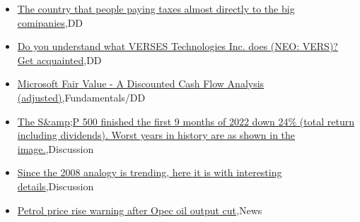 \documentclass{article}%
\begin{document}
%
\begin{itemize}%
\item%
\href{https://reddit.com/r/wallstreetbets/comments/xx4a95/the\_country\_that\_people\_paying\_taxes\_almost/}{The country that people paying taxes almost directly to the big comipanies},DD%
\item%
\href{https://reddit.com/r/Baystreetbets/comments/xwjr27/do\_you\_understand\_what\_verses\_technologies\_inc/}{Do you understand what VERSES Technologies Inc. does (NEO: VERS)? Get acquainted},DD%
\item%
\href{https://reddit.com/r/StockMarket/comments/xx1z98/microsoft\_fair\_value\_a\_discounted\_cash\_flow/}{Microsoft Fair Value - A Discounted Cash Flow Analysis (adjusted)},Fundamentals/DD%
\item%
\href{https://reddit.com/r/StockMarket/comments/xwquhx/the\_sp\_500\_finished\_the\_first\_9\_months\_of\_2022/}{The S\&amp;P 500 finished the first 9 months of 2022 down 24\% (total return including dividends). Worst years in history are as shown in the image.},Discussion%
\item%
\href{https://reddit.com/r/StockMarket/comments/xwqbf0/since\_the\_2008\_analogy\_is\_trending\_here\_it\_is/}{Since the 2008 analogy is trending, here it is with interesting details},Discussion%
\item%
\href{https://reddit.com/r/Economics/comments/xwzd9x/petrol\_price\_rise\_warning\_after\_opec\_oil\_output/}{Petrol price rise warning after Opec oil output cut},News%
\end{itemize}%
\end{document}
